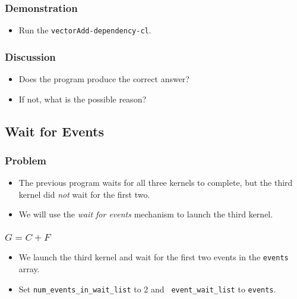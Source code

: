 \documentclass{beamer}
\begin{document}
\begin{frame}
  \frametitle{Demonstration}
  \begin{itemize}
    \item Run the {\tt vectorAdd-dependency-cl}.
  \end{itemize}
\end{frame}

\begin{frame}
  \frametitle{Discussion}
  \begin{itemize}
    \item Does the program produce the correct answer?  
    \item If not, what is the possible reason?
  \end{itemize}
\end{frame}

\subsection{Wait for Events}

\begin{frame}
  \frametitle{Problem}
  \begin{itemize}
    \item The previous program waits for all three kernels to
      complete, but the third kernel did {\em not} wait for the first
      two.
    \item We will use the {\em wait for events} mechanism to launch
      the third kernel.
  \end{itemize}
\end{frame}

\begin{frame}
\end{frame}

\begin{frame}
  \frametitle{$G = C + F$}
  \begin{itemize}
    \item We launch the third kernel and wait for the first two events
      in the {\tt events} array.
    \item Set {\tt num\_events\_in\_wait\_list} to 2 and {\tt
      event\_wait\_list} to {\tt events}.
  \end{itemize}
\end{frame}

\begin{frame}
\end{frame}
\end{document}
